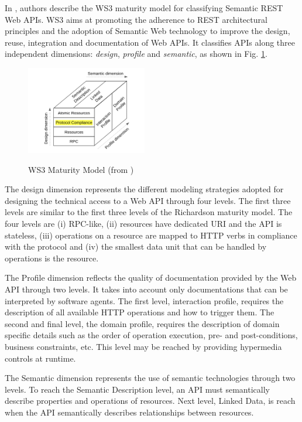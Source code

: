 In \cite{7195633}, authors describe the WS3 maturity model for classifying Semantic REST Web APIs. WS3 aims at promoting the adherence to REST architectural principles and the adoption of Semantic Web technology to improve the design, reuse, integration and documentation of Web APIs. It classifies APIs along three independent dimensions: \textit{design}, \textit{profile} and \textit{semantic}, as shown in Fig. \ref{WS3}.

\begin{figure}[ht]
  \caption{WS3 Maturity Model (from \cite{7195633})}
  \centering
  \includegraphics[width=0.47\textwidth]{figures/ws3-maturity-model.png}
  \label{WS3}
\end{figure}

The design dimension represents the different modeling strategies adopted for designing the technical access to a Web API through four levels. The first three levels are similar to the first three levels of the Richardson maturity model. The four levels are (i) RPC-like, (ii) resources have dedicated URI and the API is stateless, (iii) operations on a resource are mapped to HTTP verbs in compliance with the protocol and (iv) the smallest data unit that can be handled by operations is the resource.

The Profile dimension reflects the quality of documentation provided by the Web API through two levels. It takes into account only documentations that can be interpreted by software agents. The first level, interaction profile, requires the description of all available HTTP operations and how to trigger them. The second and final level, the domain profile, requires the description of domain specific details such as the order of operation execution, pre- and post-conditions, business constraints, etc. This level may be reached by providing hypermedia controls at runtime.

The Semantic dimension represents the use of semantic technologies through two levels. To reach the Semantic Description level, an API must semantically describe properties and operations of resources. Next level, Linked Data, is reach when the API semantically describes relationships between resources.

